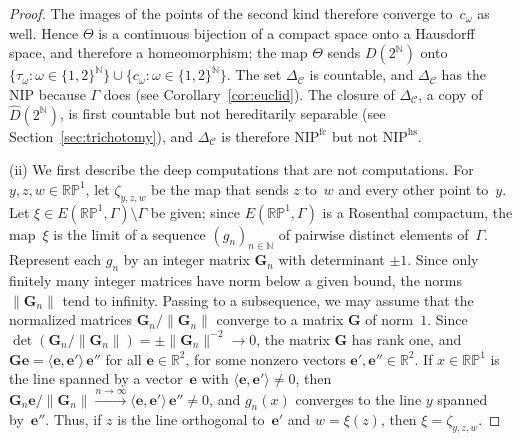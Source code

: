 \documentclass[psamsfonts]{amsart}
\theoremstyle{definition}
\theoremstyle{remark}
\newcommand{\NIP}{\text{NIP}}
\newcommand{\RP}{\mathbb{R}\mathbb{P}}
\numberwithin{equation}{section}
\begin{document}
\begin{proof}
The images of the points of the second kind therefore converge to~$c_\omega$ as well.
Hence $\Theta$ is a continuous bijection of a compact space onto a Hausdorff space, and therefore a homeomorphism;
the map $\Theta$ sends $D(2^{\mathbb{N}})$ onto $\{\tau_\omega:\omega\in\{1,2\}^{\mathbb{N}}\}\cup\{c_\omega:\omega\in\{1,2\}^{\mathbb{N}}\}$.
The set $\Delta_{\mathcal{C}}$ is countable, and $\Delta_{\mathcal{C}}$ has the NIP because $\Gamma$ does (see Corollary~\ref{cor:euclid}).
The closure of $\Delta_{\mathcal{C}}$, a copy of $\hat D(2^{\mathbb{N}})$, is first countable but not hereditarily separable (see Section~\ref{sec:trichotomy}), and $\Delta_{\mathcal{C}}$ is therefore $\NIP^{\mathrm{fc}}$ but not $\NIP^{\mathrm{hs}}$.

(ii) We first describe the deep computations that are not computations.
For $y,z,w\in\RP^1$, let $\zeta_{y,z,w}$ be the map that sends $z$ to~$w$ and every other point to~$y$.
Let $\xi\in E(\RP^1,\Gamma)\setminus\Gamma$ be given;
since $E(\RP^1,\Gamma)$ is a Rosenthal compactum, the map~$\xi$ is the limit of a sequence $(g_n)_{n\in\mathbb{N}}$ of pairwise distinct elements of~$\Gamma$.
Represent each $g_n$ by an integer matrix $\mathbf{G}_n$ with determinant $\pm1$.
Since only finitely many integer matrices have norm below a given bound, the norms $\|\mathbf{G}_n\|$ tend to infinity.
Passing to a subsequence, we may assume that the normalized matrices $\mathbf{G}_n/\|\mathbf{G}_n\|$ converge to a matrix $\mathbf{G}$ of norm~$1$.
Since $\det(\mathbf{G}_n/\|\mathbf{G}_n\|)=\pm\|\mathbf{G}_n\|^{-2}\to0$, the matrix $\mathbf{G}$ has rank one, and $\mathbf{G}\mathbf{e}=\langle\mathbf{e},\mathbf{e}'\rangle\,\mathbf{e}''$ for all $\mathbf{e}\in\mathbb{R}^2$, for some nonzero vectors $\mathbf{e}',\mathbf{e}''\in\mathbb{R}^2$.
If $x\in\RP^1$ is the line spanned by a vector~$\mathbf{e}$ with $\langle\mathbf{e},\mathbf{e}'\rangle\neq0$, then $\mathbf{G}_n\mathbf{e}/\|\mathbf{G}_n\|\xrightarrow{n\to\infty}\langle\mathbf{e},\mathbf{e}'\rangle\,\mathbf{e}''\neq0$, and $g_n(x)$ converges to the line $y$ spanned by~$\mathbf{e}''$.
Thus, if $z$ is the line orthogonal to~$\mathbf{e}'$ and $w=\xi(z)$, then $\xi=\zeta_{y,z,w}$.


\end{proof}
\end{document}
